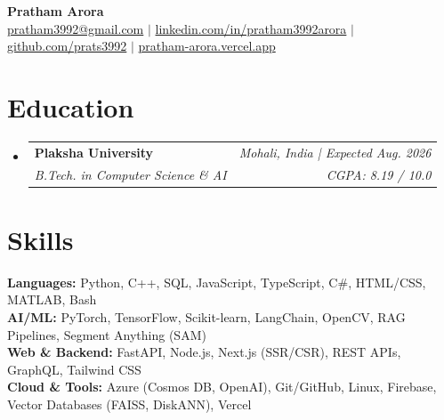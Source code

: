 \documentclass[letterpaper,11pt]{article}
\makeatletter
\newcommand{\resumeSubHeadingListStart}{\begin{itemize}[leftmargin=0.15in, label={}]}
\newcommand{\resumeSubHeadingListEnd}{\end{itemize}}
\newcommand{\resumeSubheading}[4]{
  \vspace{-2pt}\item
    \begin{tabular*}{0.97\textwidth}[t]{l@{\extracolsep{\fill}}r}
      \textbf{#1} & \textit{\small #2} \\
      \textit{\small#3} & \textit{\small #4} \\[2pt]
    \end{tabular*}
}
\makeatother
\begin{document}
\begin{center}
    \textbf{\Huge Pratham Arora} \\ \vspace{10pt}
    \small
    \href{mailto:pratham3992@gmail.com}{pratham3992@gmail.com} $|$
    \href{https://www.linkedin.com/in/pratham3992arora}{linkedin.com/in/pratham3992arora} $|$
    \href{https://github.com/prats3992}{github.com/prats3992} $|$
    \href{https://pratham-arora.vercel.app/}{pratham-arora.vercel.app}
\end{center}

\section{Education}
  \resumeSubHeadingListStart
    \resumeSubheading
      {Plaksha University}{Mohali, India | Expected Aug. 2026}
      {B.Tech. in Computer Science \& AI}{CGPA: 8.19 / 10.0}
  \resumeSubHeadingListEnd

\section{Skills}
\begin{itemize}[leftmargin=0.15in, label={}]
    \small{\item{
        \textbf{Languages:} \quad Python, C++, SQL, JavaScript, TypeScript, C\#, HTML/CSS, MATLAB, Bash \\
        \textbf{AI/ML:} \quad PyTorch, TensorFlow, Scikit-learn, LangChain, OpenCV, RAG Pipelines, Segment Anything (SAM) \\
        \textbf{Web \& Backend:} \quad FastAPI, Node.js, Next.js (SSR/CSR), REST APIs, GraphQL, Tailwind CSS \\
        \textbf{Cloud \& Tools:} \quad Azure (Cosmos DB, OpenAI), Git/GitHub, Linux, Firebase, Vector Databases (FAISS, DiskANN), Vercel
    }}
\end{itemize}

\end{document}
